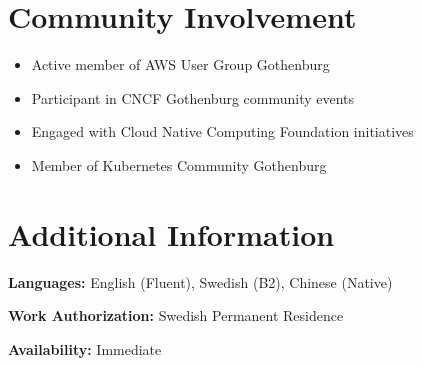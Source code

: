 \documentclass[11pt,a4paper]{article}
\begin{document}
\section*{Community Involvement}

\begin{itemize}[leftmargin=*, itemsep=2pt]
\item Active member of AWS User Group Gothenburg
\item Participant in CNCF Gothenburg community events
\item Engaged with Cloud Native Computing Foundation initiatives
\item Member of Kubernetes Community Gothenburg
\end{itemize}

\section*{Additional Information}

\textbf{Languages:} English (Fluent), Swedish (B2), Chinese (Native)

\textbf{Work Authorization:} Swedish Permanent Residence

\textbf{Availability:} Immediate
\end{document}
